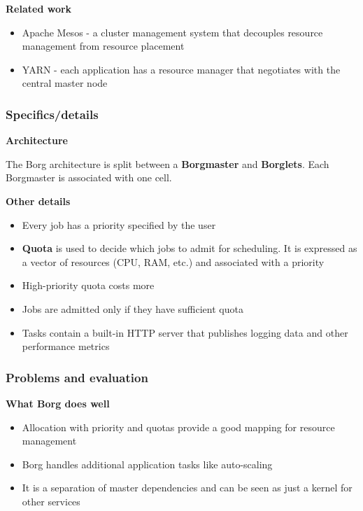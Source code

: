 \documentclass{sty/SizheArticle}
\begin{document}
\textbf{Related work} \\
\begin{itemize}
\item Apache Mesos - a cluster management system that decouples resource
management from resource placement
\item YARN - each application has a resource manager that negotiates with
the central master node
\end{itemize}

\subsubsection{Specifics/details}
\textbf{Architecture} \\

The Borg architecture is split between a \textbf{Borgmaster} and \textbf{Borglets}.
Each Borgmaster is associated with one cell.


\textbf{Other details}
\begin{itemize}
\item Every job has a priority specified by the user
\item \textbf{Quota} is used to decide which jobs to admit for scheduling. It
is expressed as a vector of resources (CPU, RAM, etc.) and associated with a
priority
\item High-priority quota costs more
\item Jobs are admitted only if they have sufficient quota
\item Tasks contain a built-in HTTP server that publishes logging data and
other performance metrics
\end{itemize}

\subsubsection{Problems and evaluation}
\textbf{What Borg does well}
\begin{itemize}
\item Allocation with priority and quotas provide a good mapping for 
resource management
\item Borg handles additional application tasks like auto-scaling
\item It is a separation of master dependencies and can be seen as just a
kernel for other services
\end{itemize}
\end{document}
